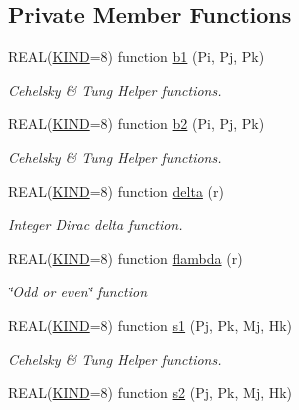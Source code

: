 \subsection*{Private Member Functions}
\begin{DoxyCompactItemize}
\item 
R\-E\-A\-L(\hyperlink{LICENSE_8txt_a8e1a82be600178fe97c0e1339897c260}{K\-I\-N\-D}=8) function \hyperlink{classinprod__analytic_aff09a3154203586660b1bd58d657a034}{b1} (Pi, Pj, Pk)
\begin{DoxyCompactList}\small\item\em Cehelsky \& Tung Helper functions. \end{DoxyCompactList}\item 
R\-E\-A\-L(\hyperlink{LICENSE_8txt_a8e1a82be600178fe97c0e1339897c260}{K\-I\-N\-D}=8) function \hyperlink{classinprod__analytic_ac6b053e661b461be404933851f254437}{b2} (Pi, Pj, Pk)
\begin{DoxyCompactList}\small\item\em Cehelsky \& Tung Helper functions. \end{DoxyCompactList}\item 
R\-E\-A\-L(\hyperlink{LICENSE_8txt_a8e1a82be600178fe97c0e1339897c260}{K\-I\-N\-D}=8) function \hyperlink{classinprod__analytic_a5ddc8ae738e1c078ac924c45996d1a60}{delta} (r)
\begin{DoxyCompactList}\small\item\em Integer Dirac delta function. \end{DoxyCompactList}\item 
R\-E\-A\-L(\hyperlink{LICENSE_8txt_a8e1a82be600178fe97c0e1339897c260}{K\-I\-N\-D}=8) function \hyperlink{classinprod__analytic_a73fd06554502cceb5397657faf762d59}{flambda} (r)
\begin{DoxyCompactList}\small\item\em \char`\"{}\-Odd or even\char`\"{} function \end{DoxyCompactList}\item 
R\-E\-A\-L(\hyperlink{LICENSE_8txt_a8e1a82be600178fe97c0e1339897c260}{K\-I\-N\-D}=8) function \hyperlink{classinprod__analytic_a6a81e3c5bb173443d4d49b68cf608e4e}{s1} (Pj, Pk, Mj, Hk)
\begin{DoxyCompactList}\small\item\em Cehelsky \& Tung Helper functions. \end{DoxyCompactList}\item 
R\-E\-A\-L(\hyperlink{LICENSE_8txt_a8e1a82be600178fe97c0e1339897c260}{K\-I\-N\-D}=8) function \hyperlink{classinprod__analytic_aad00df0ad971a05918f1f379f1fc7ee6}{s2} (Pj, Pk, Mj, Hk)

\end{DoxyCompactItemize}
